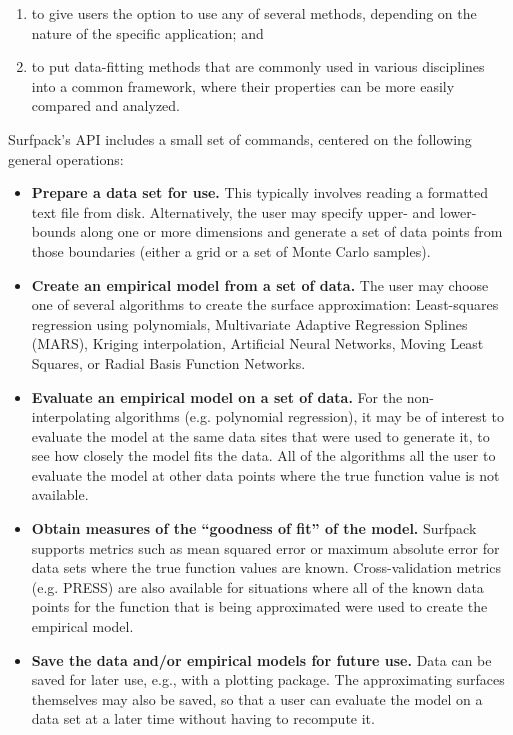 \documentclass{article}
\begin{document}
\begin{enumerate}
\item to give users the option to use any of several methods, depending on the nature of the specific application; and
\item to put data-fitting methods that are commonly used in various disciplines into a common framework, where their properties can be more easily compared and analyzed.
\end{enumerate}
Surfpack's API includes a small set of commands, centered on the following general operations:
\begin{itemize}
\item {\bf Prepare a data set for use.}  This typically involves reading a formatted text file from disk.  Alternatively, the user may specify upper- and lower-bounds along one or more dimensions and generate a set of data points from those boundaries (either a grid or a set of Monte Carlo samples).
\item {\bf Create an empirical model from a set of data.} The user may choose one of several algorithms to create the surface approximation: Least-squares regression using polynomials, Multivariate Adaptive Regression Splines (MARS), Kriging interpolation, Artificial Neural Networks, Moving Least Squares, or Radial Basis Function Networks.
\item {\bf Evaluate an empirical model on a set of data.}  For the non-interpolating algorithms (e.g. polynomial regression), it may be of interest to evaluate the model at the same data sites that were used to generate it, to see how closely the model fits the data.  All of the algorithms all the user to evaluate the model at other data points where the true function value is not available.
\item {\bf Obtain measures of the ``goodness of fit'' of the model.}  Surfpack supports metrics such as mean squared error or maximum absolute error for data sets where the true function values are known.  Cross-validation metrics (e.g. PRESS) are also available for situations where all of the known data points for the function that is being approximated were used to create the empirical model.
\item {\bf Save the data and/or empirical models for future use.}  Data can be saved for later use, e.g., with a plotting package.  The approximating surfaces themselves may also be saved, so that a user can evaluate the model on a data set at a later time without having to recompute it.
\end{itemize}
\end{document}

